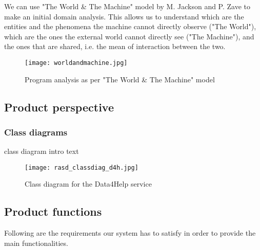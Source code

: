 \documentclass[../main.tex]{subfiles}
\begin{document}
We can use "The World \& The Machine" model by M. Jackson and P. Zave to make an initial domain analysis. This allows us to understand which are the entities and the phenomena the machine cannot directly observe ("The World"), which are the ones the external world cannot directly see ("The Machine"), and the ones that are shared, i.e. the mean of interaction between the two.

\begin{figure}[h!]
	\texttt{[image: worldandmachine.jpg]}
	\caption{Program analysis as per "The World \& The Machine" model}
	\label{fig:worldandmachine}
\end{figure}

\subsection{Product perspective}

\subsubsection{Class diagrams}

class diagram intro text
\newpage
\begin{figure}[H]
	\texttt{[image: rasd\_classdiag\_d4h.jpg]}
	\caption{Class diagram for the Data4Help service}
	\label{fig:classdiag_d4h}
\end{figure}

\subsection{Product functions}

Following are the requirements our system has to satisfy in order to provide the main functionalities.
\end{document}
